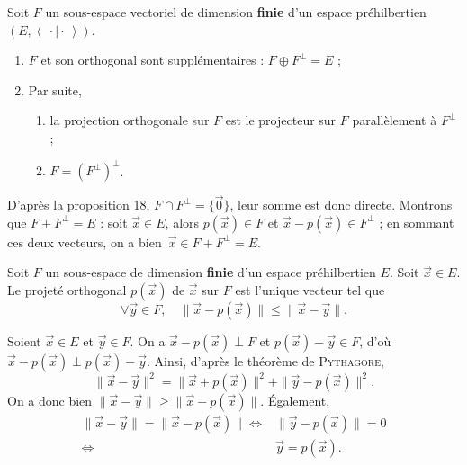 \begin{crlr}
	Soit $F$\/ un sous-espace vectoriel de dimension \textbf{finie} d'un espace préhilbertien $(E, \left<\:\cdot  \mid \cdot \: \right>)$.
	\begin{enumerate}
		\item $F$\/ et son orthogonal sont supplémentaires : $F \oplus F^\perp = E$\/ ;
		\item Par suite,
			\begin{enumerate}
				\item la projection orthogonale sur $F$\/ est le projecteur sur $F$\/ parallèlement à $F^\perp$\/ ;
				\item $F = (F^\perp)^\perp$.
			\end{enumerate}
	\end{enumerate}
\end{crlr}

\begin{prv}
	D'après la proposition 18, $F \cap F^\perp = \{\vec{0}\}$, leur somme est donc directe. Montrons que $F + F^\bot = E$ : soit $\vec{x} \in E$, alors $p(\vec{x}) \in F$\/ et $\vec{x} - p(\vec{x}) \in F^\bot$ ; en sommant ces deux vecteurs, on a bien~$\vec{x} \in F + F^\perp = E$.
\end{prv}

\begin{thm}
	Soit $F$\/ un sous-espace de dimension \textbf{finie} d'un espace préhilbertien $E$. Soit $\vec{x} \in E$. Le projeté orthogonal $p(\vec{x})$\/ de $\vec{x}$\/ sur $F$\/ est l'unique vecteur tel que \[
		\forall \vec{y} \in F,\quad \|\vec{x} - p(\vec{x})\| \le \|\vec{x} - \vec{y}\|
	.\]
\end{thm}

\begin{prv}
	Soient $\vec{x} \in E$\/ et $\vec{y} \in F$.
	On a $\vec{x} - p(\vec{x}) \perp F$\/ et $p(\vec{x})  - \vec{y} \in F$, d'où $\vec{x} - p(\vec{x}) \perp p(\vec{x}) - \vec{y}$. Ainsi, d'après le théorème de \textsc{Pythagore}, \[
		\|\vec{x} - \vec{y}\|^2 = \|\vec{x} + p(\vec{x})\|^2 + \|\vec{y} - p(\vec{x})\|^2
	.\] On a donc bien $\|\vec{x} - \vec{y}\| \ge \|\vec{x} - p(\vec{x})\|$. Également,
	\begin{align*}
		\|\vec{x} - \vec{y}\| = \|\vec{x} - p(\vec{x})\| \iff& \|\vec{y} - p(\vec{x})\| = 0\\
		\iff& \vec{y} = p(\vec{x}).
	\end{align*}
\end{prv}

